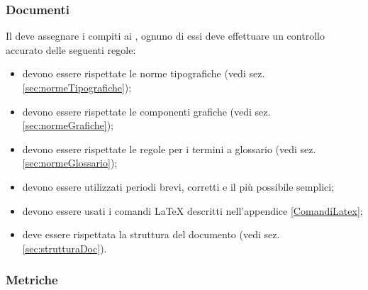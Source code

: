		\subsubsection{Documenti} \label{sec:documenti}
		Il \responsabilediprogetto{} deve assegnare i compiti ai \verificatori, ognuno di essi deve effettuare un controllo accurato delle seguenti regole:
		\begin{itemize}
			\item devono essere rispettate le norme tipografiche (vedi sez. \ref{sec:normeTipografiche});
			\item devono essere rispettate le componenti grafiche (vedi sez. \ref{sec:normeGrafiche});
			\item devono essere rispettate le regole per i termini a glossario (vedi sez. \ref{sec:normeGlossario});
			\item devono essere utilizzati periodi brevi, corretti e il più possibile semplici;
			\item devono essere usati i comandi \LaTeX{} descritti nell'appendice \ref{ComandiLatex};
			\item deve essere rispettata la struttura del documento (vedi sez. \ref{sec:strutturaDoc}).
		\end{itemize}
	
		\subsubsection{Metriche}
